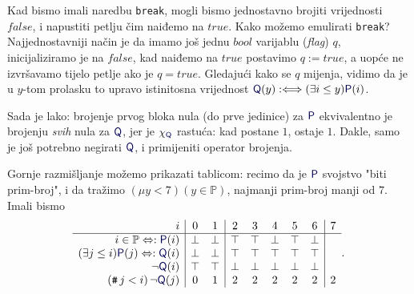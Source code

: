 Kad bismo imali naredbu \texttt{break}, mogli bismo jednostavno brojiti vrijednosti $\mathit{false}$, i napustiti petlju čim naiđemo na $\mathit{true}$. Kako možemo emulirati \texttt{break}? Najjednostavniji način je da imamo još jednu $bool$ varijablu (\emph{flag}) $q$, inicijaliziramo je na $\mathit{false}$, kad naiđemo na $\mathit{true}$ postavimo $q:=\mathit{true}$, a uopće ne izvršavamo tijelo petlje ako je $q=\mathit{true}$. Gledajući kako se $q$ mijenja, vidimo da je u $y$-tom prolasku to upravo istinitosna vrijednost $\f Q(y):\Longleftrightarrow(\exists i\le y)\f P(i)$.

Sada je lako: brojenje prvog bloka nula (do prve jedinice) za $\f P$ ekvivalentno je brojenju \emph{svih} nula za $\f Q$, jer je $\chi_{\f Q}$ rastuća: kad postane $1$, ostaje $1$. Dakle, samo je još potrebno negirati $\f Q$, i primijeniti operator brojenja.

Gornje razmišljanje možemo prikazati tablicom: recimo da je $\f P$ svojstvo "biti prim-broj", i da tražimo $(\mu y<7)(y\in\mathbb P)$, najmanji prim-broj manji od $7$. Imali bismo
\begin{equation}
    \begin{array}{r|cc|ccccc|c}
i & 0 & 1 & 2 & 3 & 4 & 5 & 6 & 7 \\\hline
i\in\mathbb P\Leftrightarrow:\f P(i) & \bot & \bot & \top & \top & \bot & \top & \bot  \\
(\exists j\le i)\f P(j)\Leftrightarrow:\f Q(i) & \bot & \bot & \top & \top & \top & \top & \top \\
\lnot\f Q(i) & \top & \top & \bot & \bot & \bot & \bot & \bot\\
(\num j<i)\,\lnot\f Q(j) & 0 & 1 & 2 & 2 & 2 & 2 & 2 & 2
\end{array}\text.
\end{equation}

